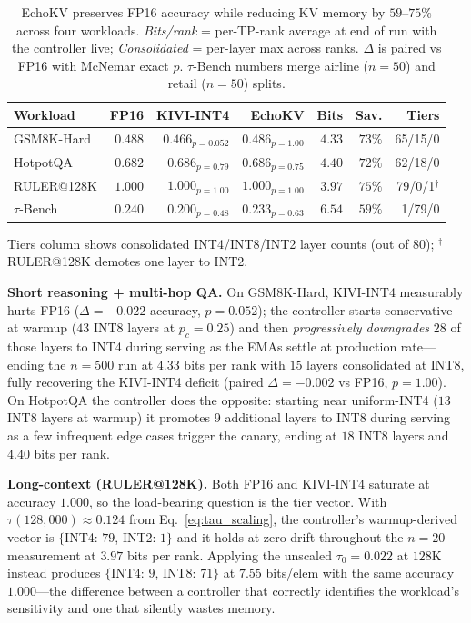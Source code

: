 \documentclass{article}
\begin{document}
\begin{table}[h]
\centering
\caption{EchoKV preserves FP16 accuracy while reducing KV memory by
  $59$--$75\%$ across four workloads. \emph{Bits/rank} = per-TP-rank
  average at end of run with the controller live; \emph{Consolidated} =
  per-layer max across ranks. $\Delta$ is paired vs FP16 with McNemar
  exact $p$. $\tau$-Bench numbers merge airline ($n{=}50$) and retail
  ($n{=}50$) splits.}
\label{tab:headline}
\footnotesize
\setlength{\tabcolsep}{4pt}
\begin{tabular}{lrrrrrr}
\toprule
Workload     & FP16    & KIVI-INT4         & EchoKV                     & Bits & Sav. & Tiers \\
\midrule
GSM8K-Hard   & $0.488$ & $0.466_{p=0.052}$ & $\mathbf{0.486}_{p=1.00}$  & $4.33$ & $73\%$ & 65/15/0 \\
HotpotQA     & $0.682$ & $0.686_{p=0.79}$  & $\mathbf{0.686}_{p=0.75}$  & $4.40$ & $72\%$ & 62/18/0 \\
RULER@128K   & $1.000$ & $1.000_{p=1.00}$  & $\mathbf{1.000}_{p=1.00}$  & $3.97$ & $75\%$ & 79/0/1$^{\dagger}$ \\
$\tau$-Bench & $0.240$ & $0.200_{p=0.48}$  & $\mathbf{0.233}_{p=0.63}$  & $6.54$ & $59\%$ & 1/79/0 \\
\bottomrule
\end{tabular}
\par\smallskip
{\footnotesize Tiers column shows consolidated INT4/INT8/INT2 layer counts (out of $80$); $^{\dagger}$RULER@128K demotes one layer to INT2.\par}
\end{table}

\textbf{Short reasoning + multi-hop QA.} On GSM8K-Hard, KIVI-INT4 measurably
hurts FP16 ($\Delta{=}{-}0.022$ accuracy, $p{=}0.052$); the controller
starts conservative at warmup ($43$ INT8 layers at $p_c{=}0.25$) and then
\emph{progressively downgrades} $28$ of those layers to INT4 during serving
as the EMAs settle at production rate---ending the $n{=}500$ run at
$4.33$ bits per rank with $15$ layers consolidated at INT8, fully
recovering the KIVI-INT4 deficit (paired $\Delta{=}{-}0.002$ vs FP16,
$p{=}1.00$). On HotpotQA the controller does the opposite: starting near
uniform-INT4 ($13$ INT8 layers at warmup) it promotes 9 additional layers
to INT8 during serving as a few infrequent edge cases trigger the canary,
ending at $18$ INT8 layers and $4.40$ bits per rank.

\textbf{Long-context (RULER@128K).} Both FP16 and KIVI-INT4 saturate at
accuracy $1.000$, so the load-bearing question is the tier vector. With
$\tau(128{,}000){\approx}0.124$ from Eq.~\ref{eq:tau_scaling}, the
controller's warmup-derived vector is $\{$INT4: $79$, INT2: $1\}$ and it
holds at zero drift throughout the $n{=}20$ measurement at $3.97$ bits per
rank. Applying the unscaled $\tau_0{=}0.022$ at $128$K instead produces
$\{$INT4: $9$, INT8: $71\}$ at $7.55$ bits/elem with the same accuracy
$1.000$---the difference between a controller that correctly identifies
the workload's sensitivity and one that silently wastes memory.
\end{document}
